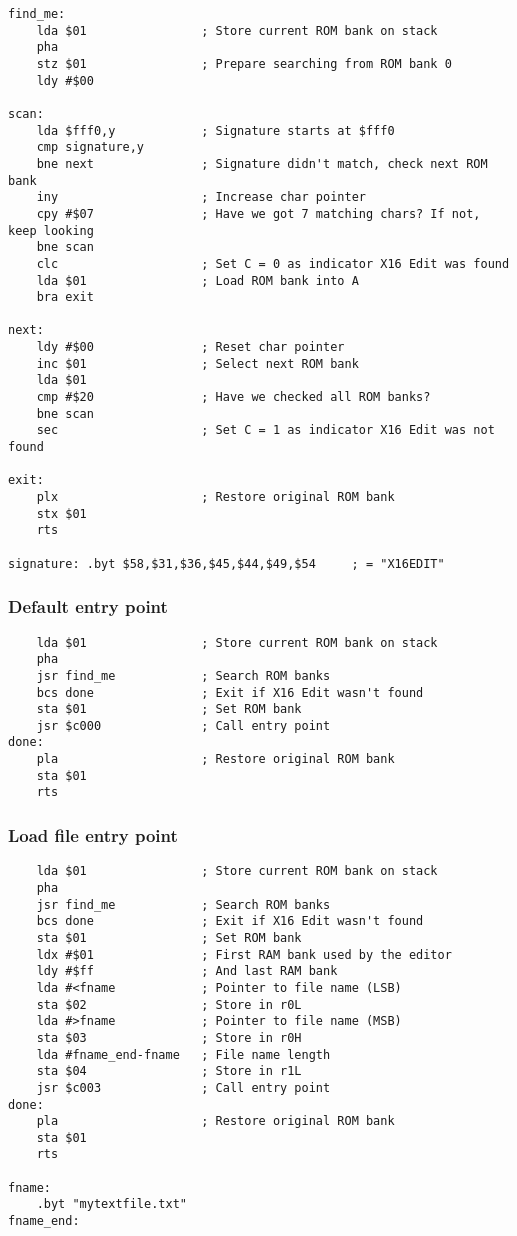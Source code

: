 \documentclass{article}
\begin{document}
\begin{verbatim}
find_me:
    lda $01                ; Store current ROM bank on stack
    pha
    stz $01                ; Prepare searching from ROM bank 0
    ldy #$00

scan:
    lda $fff0,y            ; Signature starts at $fff0
    cmp signature,y
    bne next               ; Signature didn't match, check next ROM bank
    iny                    ; Increase char pointer
    cpy #$07               ; Have we got 7 matching chars? If not, keep looking
    bne scan
    clc                    ; Set C = 0 as indicator X16 Edit was found
    lda $01                ; Load ROM bank into A
    bra exit

next:
    ldy #$00               ; Reset char pointer
    inc $01                ; Select next ROM bank
    lda $01            
    cmp #$20               ; Have we checked all ROM banks?
    bne scan
    sec                    ; Set C = 1 as indicator X16 Edit was not found

exit:
    plx                    ; Restore original ROM bank
    stx $01
    rts

signature: .byt $58,$31,$36,$45,$44,$49,$54     ; = "X16EDIT"
\end{verbatim}

    \subsubsection{Default entry point}
\begin{verbatim}
    lda $01                ; Store current ROM bank on stack
    pha
    jsr find_me            ; Search ROM banks
    bcs done               ; Exit if X16 Edit wasn't found
    sta $01                ; Set ROM bank
    jsr $c000              ; Call entry point
done:
    pla                    ; Restore original ROM bank
    sta $01
    rts
\end{verbatim}

    \subsubsection{Load file entry point}
\begin{verbatim}
    lda $01                ; Store current ROM bank on stack
    pha
    jsr find_me            ; Search ROM banks
    bcs done               ; Exit if X16 Edit wasn't found
    sta $01                ; Set ROM bank  
    ldx #$01               ; First RAM bank used by the editor
    ldy #$ff               ; And last RAM bank
    lda #<fname            ; Pointer to file name (LSB)
    sta $02                ; Store in r0L
    lda #>fname            ; Pointer to file name (MSB)
    sta $03                ; Store in r0H
    lda #fname_end-fname   ; File name length
    sta $04                ; Store in r1L
    jsr $c003              ; Call entry point
done:
    pla                    ; Restore original ROM bank
    sta $01
    rts

fname:
    .byt "mytextfile.txt"
fname_end:
\end{verbatim}
\end{document}
